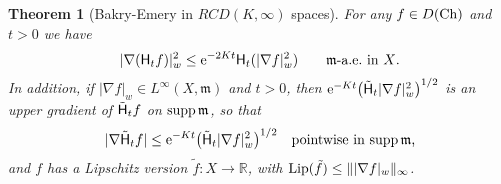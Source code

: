 \documentclass[reqno,11pt]{article}
\numberwithin{equation}{section}
\newcommand{\C}{\mathbb{C}}
\newcommand{\R}{\mathbb{R}}
\newcommand{\mm}{{\mbox{\boldmath$m$}}}
\newcommand{\rme}{{\mathrm e}}
\newcommand{\supp}{\mathop{\rm supp}\nolimits}   %
\newtheorem{theorem}{Theorem}[section]
\newcommand{\weakgrad}[1]{|\nabla #1|_w}                %
\renewcommand{\C}{{\rm Ch}}
\newcommand{\rcd}[2]{RCD(#1,#2)}
\newcommand{\heatl}{{\sf H}}
\renewcommand{\mm}{\mathfrak m}
\begin{document}
\begin{theorem}[Bakry-Emery in $\rcd K\infty$ spaces]\label{thm:bakryemery}
For any $f\in D(\C)$ and $t>0$ we have
\begin{equation}\label{eq:bakryemery}
\weakgrad{(\heatl_tf)}^2\leq
\rme^{-2Kt}\heatl_t(\weakgrad{f}^2)\qquad\text{$\mm$-a.e.~in $X$.}
\end{equation}
In addition, if
 $\weakgrad{f}\in L^\infty(X,\mm)$ and $t>0$, then
$\rme^{-Kt}\bigl(\tilde\heatl_t\weakgrad{f}^2\bigr)^{1/2}$ is an
upper gradient of $\tilde\heatl_tf$ on $\supp\mm$, so that
\begin{equation}
\text{$|\nabla\tilde\heatl_tf|\leq\rme^{-Kt}
\bigl(\tilde\heatl_t\weakgrad{f}^2\bigr)^{1/2}$\quad pointwise in
$\supp\mm$,} \label{eq:17}
\end{equation}
and $f$ has a Lipschitz version $\tilde{f}:X\to\R$,
with ${\rm Lip}(\tilde{f})\leq\|\weakgrad{f}\|_\infty$.
\end{theorem}
\end{document}
